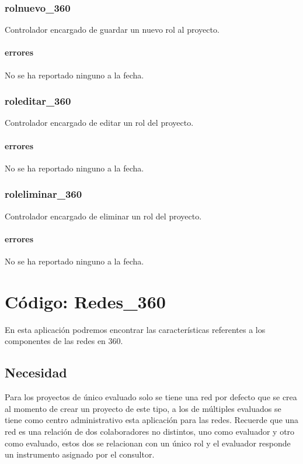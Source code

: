 \documentclass[10pt,a4paper]{book}
\begin{document}
	\subsection{rolnuevo\_360}
	Controlador encargado de guardar un nuevo rol al proyecto.
	\subsubsection{errores}
	No se ha reportado ninguno a la fecha.

	\subsection{roleditar\_360}
	Controlador encargado de editar un rol del proyecto.
	\subsubsection{errores}
	No se ha reportado ninguno a la fecha.

	\subsection{roleliminar\_360}
	Controlador encargado de eliminar un rol del proyecto.
	\subsubsection{errores}
	No se ha reportado ninguno a la fecha.


	\chapter{Código: Redes\_360}

	En esta aplicación podremos encontrar las características referentes a los componentes de las redes en 360.

	\section{Necesidad}

	Para los proyectos de único evaluado solo se tiene una red por defecto que se crea al momento de crear un proyecto de este tipo, a los de múltiples evaluados se tiene como centro administrativo esta aplicación para las redes. Recuerde que una red es una relación de dos colaboradores no distintos, uno como evaluador y otro como evaluado, estos dos se relacionan con un único rol y el evaluador responde un instrumento asignado por el consultor.
\end{document}
